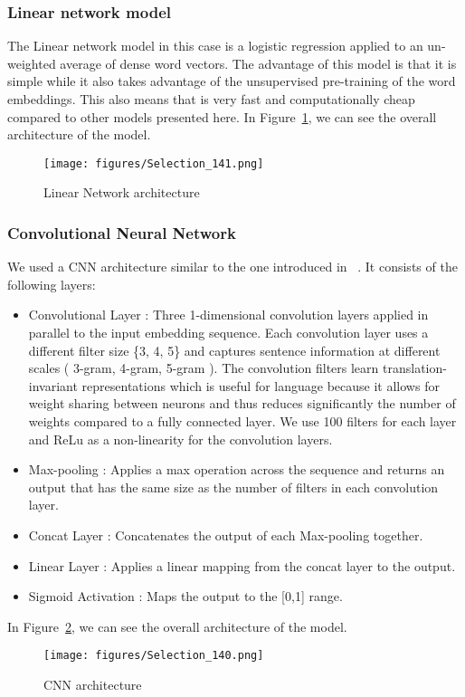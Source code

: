 \documentclass[11pt,a4paper]{article}
\begin{document}
\subsubsection{Linear network model}
The Linear network model in this case is a logistic regression applied to an un-weighted average of dense word vectors. The advantage of this model is that it is simple while it also takes advantage of the unsupervised pre-training of the word embeddings. This also means that is very fast and computationally cheap compared to other models presented here. In Figure~\ref{fig:model_linear}, we can see the overall architecture of the model. 
\begin{figure}[h!]
  \centering
    \texttt{[image: figures/Selection\_141.png]}
    \caption{Linear Network architecture}
    \label{fig:model_linear}
\end{figure}
\subsubsection{Convolutional Neural Network}
We used a CNN architecture similar to the one introduced in ~\cite{kim2014convolutional}. It consists of the following layers:
\begin{itemize}
\item Convolutional Layer : Three 1-dimensional convolution layers applied in parallel to the input embedding sequence. Each convolution layer uses a different filter size \{3, 4, 5\} and captures sentence information at different scales ( 3-gram, 4-gram, 5-gram ). The convolution filters learn translation-invariant representations which is useful for language because it allows for weight sharing between neurons and thus reduces significantly the number of weights compared to a fully connected layer. We use 100 filters for each layer and ReLu as a non-linearity for the convolution layers.
\item Max-pooling : Applies a max operation across the sequence and returns an output that has the same size as the number of filters in each convolution layer.
\item Concat Layer : Concatenates the output of each Max-pooling together.
\item Linear Layer : Applies a linear mapping from the concat layer to the output.
\item Sigmoid Activation : Maps the output to the [0,1] range.
\end{itemize}

In Figure~\ref{fig:model_cnn}, we can see the overall architecture of the model. 
\begin{figure}[h!]
  \centering
    \texttt{[image: figures/Selection\_140.png]}
    \caption{CNN architecture}
    \label{fig:model_cnn}
\end{figure}
\end{document}
